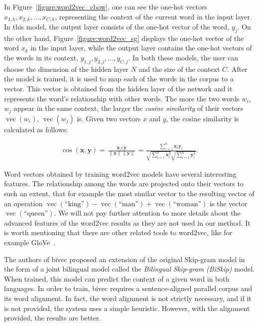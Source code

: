 In Figure~\ref{figure:word2vec_cbow}, one can see the one-hot vectors $x_{1,k}, x_{2,k}, \ldots, x_{C,k}$, representing the context of the current word in the input layer. In this model, the output layer consists of the one-hot vector of the word, $y_j$. On the other hand, Figure~\ref{figure:word2vec_sg} displays the one-hot vector of the word $x_k$ in the input layer, while the output layer contains the one-hot vectors of the words in its context, $y_{1,j}, y_{2,j}, \ldots, y_{C,j}$. In both these models, the user can choose the dimension of the hidden layer $N$ and the size of the context $C$. After the model is trained, it is used to map each of the words in the corpus to a vector. This vector is obtained from the hidden layer of the network and it represents the word's relationship with other words. The more the two words $w_i$, $w_j$ appear in the same context, the larger the \textit{cosine similarity} of their vectors $\operatorname{vec}(w_i)$, $\operatorname{vec}(w_j)$ is. Given two vectors $x$ and $y$, the cosine similarity is calculated as follows:

\begin{align*}
\operatorname{cos}(\textbf{x}, \textbf{y})=\frac{\textbf{x}\times\textbf{y}}{\lVert\textbf{x}\rVert\lVert\textbf{y}\rVert}= 
\frac{\sum\limits_{i=1}^{n} \textbf{x}_i\textbf{y}_i}{\sqrt{\sum\limits_{i=1}^{n} \textbf{x}_i^2} \sqrt{\sum\limits_{i=1}^{n} \textbf{y}_i^2}}.
\end{align*}

Word vectors obtained by training word2vec models have several interesting features. The relationship among the words are projected onto their vectors to such an extent, that for example the most similar vector to the resulting vector of an operation $\operatorname{vec}(\text{``king''}) - \operatorname{vec}(\text{``man''}) + \operatorname{vec}(\text{``woman''})$ is the vector $\operatorname{vec}(\text{``queen''})$. We will not pay further attention to more details about the advanced features of the word2vec results as they are not used in our method. It is worth mentioning that there are other related tools to word2vec, like for example GloVe~\cite{Pennigton14}.

The authors of bivec proposed an extension of the original Skip-gram model in the form of a joint bilingual model called the \textit{Bilingual Skip-gram (BiSkip)} model. When trained, this model can predict the context of a given word in both languages. In order to train, bivec requires a sentence-aligned parallel corpus and its word alignment. In fact, the word alignment is not strictly necessary, and if it is not provided, the system uses a simple heuristic. However, with the alignment provided, the results are better.

